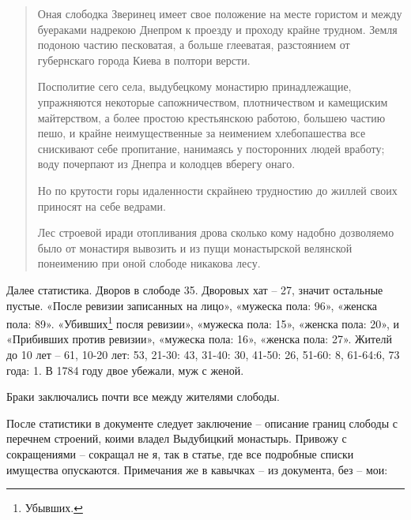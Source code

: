 \begin{quotation}
Оная слободка Зверинец имеет свое положение на месте гористом и между буераками надрекою Днепром к проезду и проходу крайне трудном. Земля подоною частию песковатая, а больше глееватая, разстоянием от губернскаго города Киева в полтори версти. 

Посполитие сего села, выдубецкому монастирю принадлежащие, упражняются некоторые сапожничеством, плотничеством и камещиским майтерством, а более простою крестьянскою работою, большею частию пешо, и крайне неимущественные за неимением хлебопашества все снискивают себе пропитание, нанимаясь у посторонних людей вработу; воду почерпают из Днепра и колодцев вберегу онаго.

Но по крутости горы идаленности скрайнею трудностию до жиллей своих приносят на себе ведрами.

Лес строевой иради отопливания дрова сколько кому надобно дозволяемо было от монастиря вывозить и из пущи монастырской велянской понеимению при оной слободе никакова лесу.
\end{quotation}

Далее статистика. Дворов в слободе 35. Дворовых хат – 27, значит остальные пустые. «После ревизии записанных на лицо», «мужеска пола: 96», «женска пола: 89». «Убивших\footnote{Убывших.} посля ревизии», «мужеска пола: 15», «женска пола: 20», и «Прибивших против ревизии», «мужеска пола: 16», «женска пола: 27». Жителй до 10 лет – 61, 10-20 лет: 53, 21-30: 43, 31-40: 30, 41-50: 26, 51-60: 8, 61-64:6, 73 года: 1. В 1784 году двое убежали, муж с женой.

Браки заключались почти все между жителями слободы.

После статистики в документе следует заключение – описание границ слободы с перечнем строений, коими владел Выдубицкий монастырь. Привожу с  сокращениями – сокращал не я, так в статье, где все подробные списки имущества опускаются. Примечания же в кавычках – из документа, без – мои:

